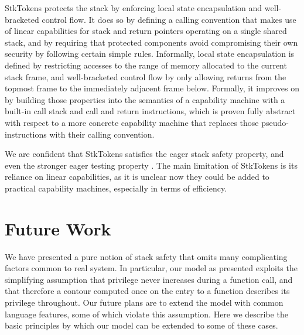 \documentclass[acmsmall,review,anonymous]{acmart}\settopmatter{printfolios=true,printccs=false,printacmref=false}
\begin{document}
StkTokens \citep{Skorstengaard+19} protects the stack by enforcing local state
encapsulation and well-bracketed control flow. It does so by defining a calling
convention that makes use of linear capabilities for stack and return pointers
operating on a single shared stack, and by requiring that protected components
avoid compromising their own security by following certain simple rules.
Informally, local state encapsulation is defined by restricting accesses to the
range of memory allocated to the current stack frame, and well-bracketed control
flow by only allowing returns from the topmost frame to the immediately adjacent
frame below. Formally, it improves on \citet{Skorstengaard+19b} by building
those properties into the semantics of a capability machine with a built-in call
stack and call and return instructions, which is proven fully abstract with
respect to a more concrete capability machine that replaces those
pseudo-instructions with their calling convention.

We are confident  that
StkTokens satisfies the eager stack safety property, and even the stronger eager
testing property . The main limitation of StkTokens is its reliance on
linear capabilities, as it is unclear now they could be added to practical
capability machines, especially in terms of efficiency.
%


\section{Future Work}
  \label{sec:future}

  We have presented a pure notion of stack safety that omits many complicating
  factors common to real system. In particular, our model as presented exploits
  the simplifying assumption that privilege never increases during a function
  call, and that therefore a contour computed once on the entry to a function
  describes its privilege throughout. Our future plans are to extend the model
  with common language features, some of which violate this assumption. Here we
  describe the basic principles by which our model can be extended to some of
  these cases.
\end{document}
